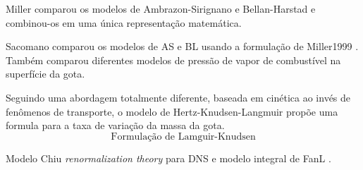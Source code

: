 Miller  comparou os modelos de Ambrazon-Sirignano e Bellan-Harstad e combinou-os em uma única representação matemática.

Sacomano \cite{SacomanoF2019IJHMT} comparou os modelos de AS e BL usando a formulação de Miller1999 . 
Também comparou diferentes modelos de pressão de vapor de combustível na superfície da gota.

Seguindo uma abordagem totalmente diferente, baseada em cinética ao invés de fenômenos de transporte, o modelo de Hertz-Knudsen-Langmuir  propõe uma formula para a taxa de variação da massa da gota.
\begin{equation}
    \text{Formulação de Lamguir-Knudsen}
\end{equation}



Modelo Chiu \emph{renormalization theory}  para DNS e modelo integral de FanL .
